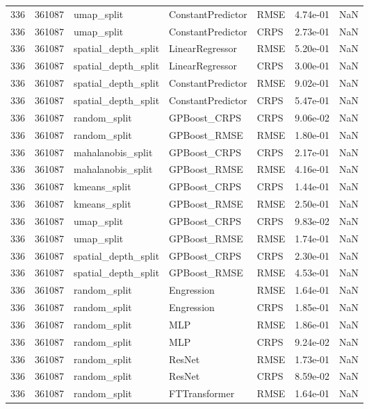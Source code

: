\begin{tabular}{rrlllrr}
336 & 361087 & umap\_split & ConstantPredictor & RMSE & 4.74e-01 & NaN \\
336 & 361087 & umap\_split & ConstantPredictor & CRPS & 2.73e-01 & NaN \\
336 & 361087 & spatial\_depth\_split & LinearRegressor & RMSE & 5.20e-01 & NaN \\
336 & 361087 & spatial\_depth\_split & LinearRegressor & CRPS & 3.00e-01 & NaN \\
336 & 361087 & spatial\_depth\_split & ConstantPredictor & RMSE & 9.02e-01 & NaN \\
336 & 361087 & spatial\_depth\_split & ConstantPredictor & CRPS & 5.47e-01 & NaN \\
336 & 361087 & random\_split & GPBoost\_CRPS & CRPS & 9.06e-02 & NaN \\
336 & 361087 & random\_split & GPBoost\_RMSE & RMSE & 1.80e-01 & NaN \\
336 & 361087 & mahalanobis\_split & GPBoost\_CRPS & CRPS & 2.17e-01 & NaN \\
336 & 361087 & mahalanobis\_split & GPBoost\_RMSE & RMSE & 4.16e-01 & NaN \\
336 & 361087 & kmeans\_split & GPBoost\_CRPS & CRPS & 1.44e-01 & NaN \\
336 & 361087 & kmeans\_split & GPBoost\_RMSE & RMSE & 2.50e-01 & NaN \\
336 & 361087 & umap\_split & GPBoost\_CRPS & CRPS & 9.83e-02 & NaN \\
336 & 361087 & umap\_split & GPBoost\_RMSE & RMSE & 1.74e-01 & NaN \\
336 & 361087 & spatial\_depth\_split & GPBoost\_CRPS & CRPS & 2.30e-01 & NaN \\
336 & 361087 & spatial\_depth\_split & GPBoost\_RMSE & RMSE & 4.53e-01 & NaN \\
336 & 361087 & random\_split & Engression & RMSE & 1.64e-01 & NaN \\
336 & 361087 & random\_split & Engression & CRPS & 1.85e-01 & NaN \\
336 & 361087 & random\_split & MLP & RMSE & 1.86e-01 & NaN \\
336 & 361087 & random\_split & MLP & CRPS & 9.24e-02 & NaN \\
336 & 361087 & random\_split & ResNet & RMSE & 1.73e-01 & NaN \\
336 & 361087 & random\_split & ResNet & CRPS & 8.59e-02 & NaN \\
336 & 361087 & random\_split & FTTransformer & RMSE & 1.64e-01 & NaN \\

\end{tabular}
